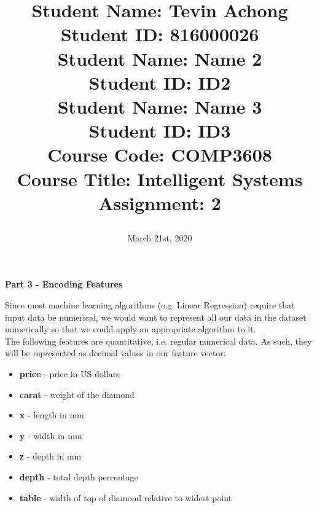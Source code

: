 \documentclass[a4paper, 12pt]{article}
\begin{document}
\title{
		\textbf{Student Name:} Tevin Achong\\
		\textbf{Student ID:} 816000026\\
		\textbf{Student Name:} Name 2\\
		\textbf{Student ID:} ID2\\			
		\textbf{Student Name:} Name 3\\
		\textbf{Student ID:} ID3\\			
		\textbf{Course Code:} COMP3608\\
		\textbf{Course Title:} Intelligent Systems\\
		\textbf{Assignment:} 2
		\date{March 21st, 2020}
}
\maketitle

\newpage
{}

\begin{center}
	\textbf{Part 3 - Encoding Features}
\end{center}

Since most machine learning algorithms (e.g. Linear Regression) require that input data be numerical, we would want to represent all our data in the dataset numerically so that we could apply an appropriate algorithm to it.\\

The following features are quantitative, i.e. regular numerical data. As such, they will be represented as decimal values in our feature vector:
\begin{itemize}
\item
\textbf{price} - price in US dollars
\item
\textbf{carat} - weight of the diamond
\item
\textbf{x} - length in mm
\item
\textbf{y} - width in mm
\item
\textbf{z} - depth in mm
\item
\textbf{depth} - total depth percentage
\item
\textbf{table} - width of top of diamond relative to widest point
\end{itemize}
\end{document}
